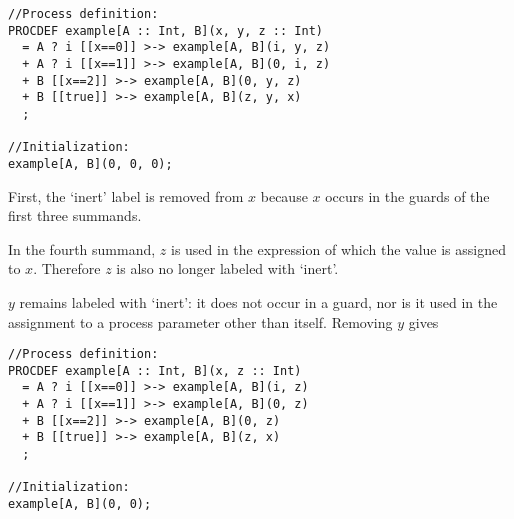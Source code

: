 \begin{lstlisting}
//Process definition:
PROCDEF example[A :: Int, B](x, y, z :: Int)
  = A ? i [[x==0]] >-> example[A, B](i, y, z)
  + A ? i [[x==1]] >-> example[A, B](0, i, z)
  + B [[x==2]] >-> example[A, B](0, y, z)
  + B [[true]] >-> example[A, B](z, y, x)
  ;

//Initialization:
example[A, B](0, 0, 0);
\end{lstlisting}

First, the `inert' label is removed from $x$ because $x$ occurs in the guards of the first three summands.

In the fourth summand, $z$ is used in the expression of which the value is assigned to $x$.
Therefore $z$ is also no longer labeled with `inert'.

$y$ remains labeled with `inert': it does not occur in a guard, nor is it used in the assignment to a process parameter other than itself.
Removing $y$ gives

\begin{lstlisting}
//Process definition:
PROCDEF example[A :: Int, B](x, z :: Int)
  = A ? i [[x==0]] >-> example[A, B](i, z)
  + A ? i [[x==1]] >-> example[A, B](0, z)
  + B [[x==2]] >-> example[A, B](0, z)
  + B [[true]] >-> example[A, B](z, x)
  ;

//Initialization:
example[A, B](0, 0);
\end{lstlisting}



